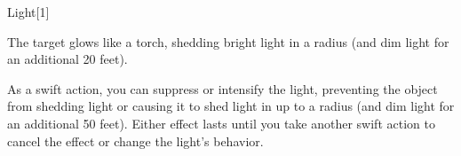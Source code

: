 \begin{spellsection}{Light}[1]
    \begin{spellheader}
    \end{spellheader}
    \begin{spellcontent}
        \begin{spelltargetinginfo}
        \end{spelltargetinginfo}
        \begin{spelleffects}
            \spelleffect The target glows like a torch, shedding bright light in a \areamed radius (and dim light for an additional 20 feet).

            As a swift action, you can suppress or intensify the light, preventing the object from shedding light or causing it to shed light in up to a \arealarge radius (and dim light for an additional 50 feet).
            Either effect lasts until you take another swift action to cancel the effect or change the light's behavior.
            \spelldur \durext \dismissable
        \end{spelleffects}
    \end{spellcontent}
    \begin{spellfooter}
    \end{spellfooter}
    \begin{spellaugments}
    \end{spellaugments}
\end{spellsection}

